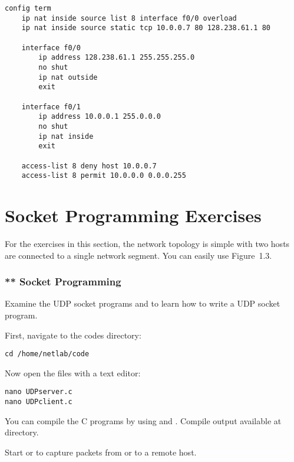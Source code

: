 \documentclass{../UTNetLab}
\begin{document}
\begin{lstlisting}[language={cisco}, caption={PAT Router Configuration in \hyperref[fig:8.7]{Figure~8.7} (Table~8.6)\label{tab:8.6}}]
config term
    ip nat inside source list 8 interface f0/0 overload
    ip nat inside source static tcp 10.0.0.7 80 128.238.61.1 80

    interface f0/0
        ip address 128.238.61.1 255.255.255.0
        no shut
        ip nat outside
        exit

    interface f0/1
        ip address 10.0.0.1 255.0.0.0
        no shut
        ip nat inside
        exit

    access-list 8 deny host 10.0.0.7
    access-list 8 permit 10.0.0.0 0.0.0.255
\end{lstlisting}

\part{Socket Programming Exercises}
For the exercises in this section, the network topology is simple with two hosts are connected to a single network segment.
You can easily use Figure~1.3.

\section{** Socket Programming}
Examine the UDP socket programs  and  to learn how to write a UDP socket program.

First, navigate to the codes directory:

\begin{lstlisting}
cd /home/netlab/code
\end{lstlisting}

Now open the files with a text editor:

\begin{lstlisting}
nano UDPserver.c
nano UDPclient.c
\end{lstlisting}

You can compile the C programs by using  and .
Compile output available at  directory.

Start  or  to capture packets from or to a remote host.
\end{document}
